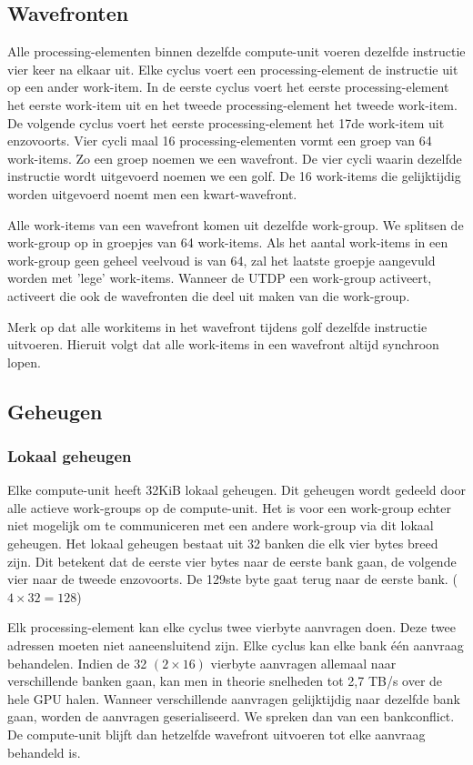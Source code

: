 \subsection{Wavefronten}
\label{wavefront}
Alle processing-elementen binnen dezelfde compute-unit voeren dezelfde instructie vier keer na elkaar uit. Elke cyclus voert een processing-element de instructie uit op een ander work-item. In de eerste cyclus voert het eerste processing-element het eerste work-item uit en het tweede processing-element het tweede work-item. De volgende cyclus voert het eerste processing-element het 17de work-item uit enzovoorts. Vier cycli maal 16 processing-elementen vormt een groep van 64 work-items. Zo een groep noemen we een wavefront. De vier cycli waarin dezelfde instructie wordt uitgevoerd noemen we een golf. De 16 work-items die gelijktijdig worden uitgevoerd noemt men een kwart-wavefront.

Alle work-items van een wavefront komen uit dezelfde work-group. We splitsen de work-group op in groepjes van 64 work-items. Als het aantal work-items in een work-group geen geheel veelvoud is van 64, zal het laatste groepje aangevuld worden met 'lege' work-items. Wanneer de UTDP een work-group activeert, activeert die ook de wavefronten die deel uit maken van die work-group.

Merk op dat alle workitems in het wavefront tijdens golf dezelfde instructie uitvoeren. Hieruit volgt dat alle work-items in een wavefront altijd synchroon lopen.



\subsection{Geheugen}

\subsubsection{Lokaal geheugen}
Elke compute-unit heeft 32KiB lokaal geheugen. Dit geheugen wordt gedeeld door alle actieve work-groups op de compute-unit. Het is voor een work-group echter niet mogelijk om te communiceren met een andere work-group via dit lokaal geheugen. Het lokaal geheugen bestaat uit 32 banken die elk vier bytes breed zijn. Dit betekent dat de eerste vier bytes naar de eerste bank gaan, de volgende vier naar de tweede enzovoorts. De 129ste byte gaat terug naar de eerste bank. ($4 \times 32 = 128$)

Elk processing-element kan elke cyclus twee vierbyte aanvragen doen. Deze twee adressen moeten niet aaneensluitend zijn. Elke cyclus kan elke bank \'e\'en aanvraag behandelen. Indien de 32 $(2 \times 16)$ vierbyte aanvragen allemaal naar verschillende banken gaan, kan men in theorie snelheden tot 2,7 TB/s over de hele GPU halen. Wanneer verschillende aanvragen gelijktijdig naar dezelfde bank gaan, worden de aanvragen geserialiseerd. We spreken dan van een bankconflict. De compute-unit blijft dan hetzelfde wavefront uitvoeren tot elke aanvraag behandeld is.

